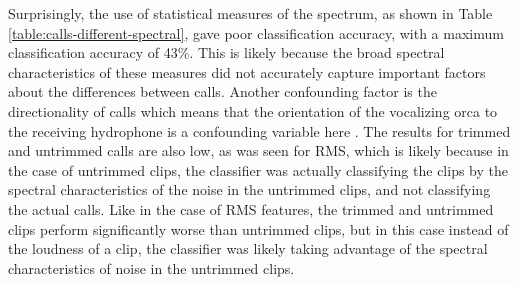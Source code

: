 \documentclass[12pt,oneside]{book}
\begin{document}
Surprisingly, the use of statistical measures of the spectrum, as
shown in Table \ref{table:calls-different-spectral}, gave poor
classification accuracy, with a maximum classification accuracy of
43\%.  This is likely because the broad spectral characteristics of
these measures did not accurately capture important factors about the
differences between calls.  Another confounding factor is the
directionality of calls which means that the orientation of the
vocalizing orca to the receiving hydrophone is a confounding variable
here \cite{miller2002mixed}.  The results for trimmed and untrimmed
calls are also low, as was seen for RMS, which is likely because in
the case of untrimmed clips, the classifier was actually classifying
the clips by the spectral characteristics of the noise in the
untrimmed clips, and not classifying the actual calls.  Like in the
case of RMS features, the trimmed and untrimmed clips perform
significantly worse than untrimmed clips, but in this case instead of
the loudness of a clip, the classifier was likely taking advantage of
the spectral characteristics of noise in the untrimmed clips.
\end{document}
